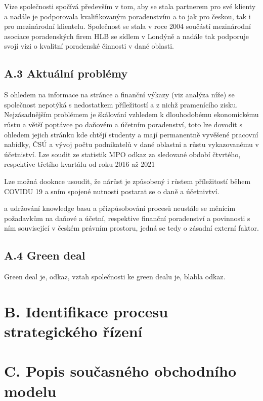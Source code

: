 Vize společnosti spočívá především v tom, aby se stala partnerem pro své klienty a nadále je podporovala kvalifikovaným poradenstvím a to jak pro českou, tak i pro mezinárodní klientelu. Společnost se stala v roce 2004 součástí mezinárodní asociace poradenských firem HLB se sídlem v Londýně a nadále tak podporuje svojí vizi o kvalitní poradenské činnosti v dané oblasti.

\subsection*{A.3 Aktuální problémy}

S ohledem na informace na stránce a finanční výkazy (viz analýza níže) se společnost nepotýká s nedostatkem příležitostí a z nichž pramenícího zisku. Nejzásadnějším problémem je škálování vzhledem k dlouhodobému ekonomickému růstu a větší poptávce po daňovém a účetním poradenství, toto lze dovodit s ohledem jejich stránku kde chtějí studenty a mají permanentně vyvěšené pracovní nabídky, ČSÚ a vývoj počtu podnikatelů v dané oblastni a růstu vykazovanému v účetniství. Lze soudit ze statistik MPO odkaz za sledované období čtvrtého, respektive třetího kvartálu od roku 2016 až 2021



Lze možná dooknce usoudit, že nárůst je způsobený i růstem příležitostí během COVIDU 19 a sním spojené nutnosti postarat se o daně a účetnivtví.


 a udržování knowledge basu a přizpůsobování procesů neustále se měnícím požadavkům na daňové a účetní, respektive finanční poradenství a povinnosti s ním související v českém právním prostoru, jedná se tedy o zásadní externí faktor.

\subsection*{A.4 Green deal}

Green deal je, odkaz, vztah společnosti ke green dealu je, blabla odkaz.

\section*{B. Identifikace procesu strategického řízení}

\section*{C. Popis současného obchodního modelu}

